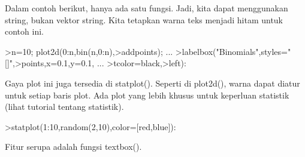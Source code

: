 \documentclass[a4paper,10pt]{article}
\begin{document}
\begin{eulernotebook}
\begin{eulercomment}
\begin{eulercomment}
\begin{eulercomment}
\begin{eulercomment}
\begin{eulercomment}
\begin{eulercomment}
\begin{eulercomment}
\begin{eulercomment}
\begin{eulercomment}
\begin{eulercomment}
\begin{eulercomment}
Dalam contoh berikut, hanya ada satu fungsi. Jadi, kita dapat
menggunakan string, bukan vektor string. Kita tetapkan warna teks
menjadi hitam untuk contoh ini. 
\end{eulercomment}
\begin{eulerprompt}
>n=10; plot2d(0:n,bin(n,0:n),>addpoints); ...
>labelbox("Binomials",styles="[]",>points,x=0.1,y=0.1, ...
>tcolor=black,>left):
\end{eulerprompt}
\begin{eulercomment}
Gaya plot ini juga tersedia di statplot(). Seperti di plot2d(), warna
dapat diatur untuk setiap baris plot. Ada plot yang lebih khusus untuk
keperluan statistik (lihat tutorial tentang statistik).
\end{eulercomment}
\begin{eulerprompt}
>statplot(1:10,random(2,10),color=[red,blue]):
\end{eulerprompt}
\begin{eulercomment}
Fitur serupa adalah fungsi textbox().


\end{eulercomment}
\end{eulercomment}
\end{eulercomment}
\end{eulercomment}
\end{eulercomment}
\end{eulercomment}
\end{eulercomment}
\end{eulercomment}
\end{eulercomment}
\end{eulercomment}
\end{eulercomment}
\end{eulernotebook}
\end{document}
